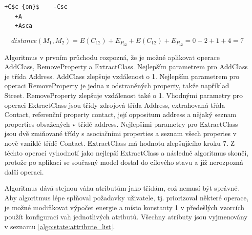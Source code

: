 \documentclass[11pt,twoside,a4paper]{book}
\begin{document}
\begin{lstlisting}[mathescape,frame=single,caption=Textový patch
modelů pro ukázkový příklad v delta notaci,label=algo:state:delta_example]
   +C$c_{on}$    -Csc
   +A            
   +Asca
\end{lstlisting}


$$distance(M_1,M_2) = E(C_{12}) + E_{P_{12}} + E(C_{12})
+ E_{P_{12}} = 0 + 2 + 1 + 4 = 7$$

Algoritmus v prvním průchodu rozpozná, že je možné aplikovat operace
AddClass, RemoveProperty a ExtractClass. Nejlepším parametrem pro AddClass je
třída Address. AddClass zlepšuje vzdálenost o 1. Nejlepším parametrem pro
operaci RemoveProperty je jedna z odstraněných property, takže například
Street. RemoveProperty zlepšuje vzdálenost také o 1. Vhodnými
parametry pro operaci ExtractClass jsou třídy zdrojová třída Address,
extrahovaná třída Contact, referenční property contact, její oppositum address a
nějaký seznam properties obsažených v třídě address.
Nejlepšími parametry pro ExtractClass jsou dvě zmiňované třídy s asociačními
properties a seznam všech properies v nově vzniklé třídě Contact. ExtractClass
má hodnotu zlepšujícího kroku 7. Z těchto operací vyhodnotí jako nejlepší
ExtractClass a následně algoritmus skončí, protože po aplikaci se současný
model dostal do cílového stavu a již nerozpozná další operaci.


Algoritmus dává stejnou váhu atributům jako třídám, což nemusí být
správné. Aby algoritmus lépe splňoval požadavky uživatele, tj. priorizoval
některé operace, je možné modifikovat výpočet energie a místo konstanty 1 v
předešlých vzorcích použít konfiguraci vah jednotlivých atributů.
Všechny atributy jsou vyjmenovány v seznamu \ref{algo:state:attribute_list}.
\end{document}
